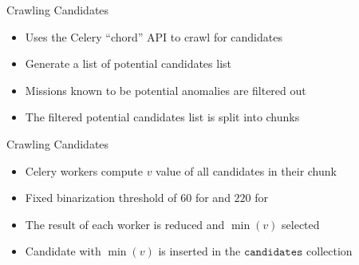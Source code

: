 \begin{frame}{Crawling Candidates}
    \begin{itemize}
        \item Uses the Celery ``chord'' API to crawl for candidates
        \item Generate a list of potential candidates list
        \item Missions known to be potential anomalies are filtered out
        \item The filtered potential candidates list is split into chunks
    \end{itemize}
\end{frame}

\begin{frame}{Crawling Candidates}
    \begin{itemize}
        \item Celery workers compute $v$ value of all candidates in their chunk
        \item Fixed binarization threshold of $60$ for \usno and $220$ for \panstarrs
        \item The result of each worker is reduced and $\min(v)$ selected
        \item Candidate with $\min(v)$ is inserted in the $\texttt{candidates}$ collection
    \end{itemize}
\end{frame}


